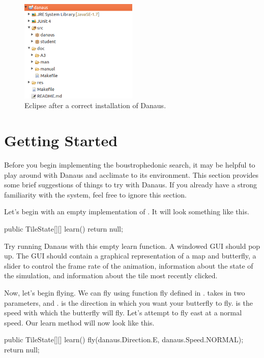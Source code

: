 \documentclass{pset}
\begin{document}
\begin{figure}[h]
  \centering
  \includegraphics[width=0.5\textwidth]{img/eclipse}
  \caption{Eclipse after a correct installation of Danaus.}
  \label{fig:eclipse}
\end{figure}

\part{Getting Started}
Before you begin implementing the boustrophedonic search, it may be helpful to
play around with Danaus and acclimate to its environment. This section provides
some brief suggestions of things to try with Danaus. If you already have a
strong familiarity with the system, feel free to ignore this section.

Let's begin with an empty implementation of . It will look
something like this.

\begin{Java}
public TileState[][] learn() {return null;}
\end{Java}

Try running Danaus with this empty learn function. A windowed GUI should pop
up. The GUI should contain a graphical representation of a map and butterfly, a
slider to control the frame rate of the animation, information about the state
of the simulation, and information about the tile most recently clicked.

Now, let's begin flying. We can fly using function fly defined in
.  takes in two parameters, 
and .  is the direction in which you want your butterfly
to fly.  is the speed with which the butterfly will fly. Let's attempt
to fly east at a normal speed. Our learn method will now look like this.

\begin{Java}
public TileState[][] learn() {
    fly(danaus.Direction.E, danaus.Speed.NORMAL);
    return null;
}
\end{Java}
\end{document}

